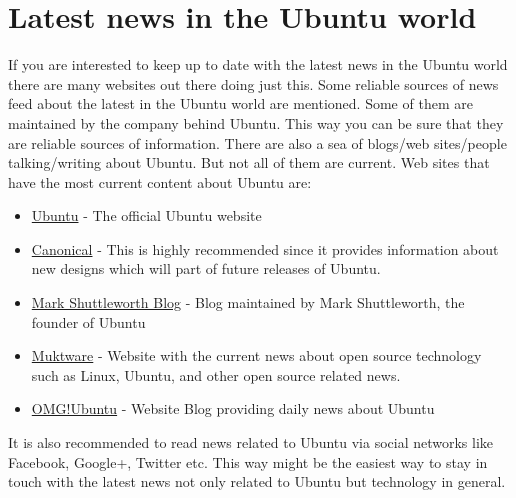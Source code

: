 \section{Latest news in the Ubuntu world} 
If you are interested to keep up to date with the latest news in the Ubuntu world there are many websites out there doing just this. Some reliable sources of news feed about the latest in the Ubuntu world are mentioned. Some of them are maintained by the company behind Ubuntu. This way you can be sure that they are reliable sources of information. There are also a sea of blogs/web sites/people talking/writing about Ubuntu. But not all of them are current.  Web sites that have the most current content about Ubuntu are: 

\begin{itemize}
\item \href{http://www.ubuntu.com}{Ubuntu} - The official Ubuntu website
\item \href{http://design.canonical.com/}{Canonical} - This is highly recommended since it provides information about new designs which will part of future releases of Ubuntu.
\item \href{http://markshuttleworth.com/}{Mark Shuttleworth Blog} - Blog maintained by Mark Shuttleworth, the founder of Ubuntu
\item \href{http://www.muktware.com/}{Muktware} - Website with the current news about open source technology such as Linux, Ubuntu, and other open source related news.
\item \href{http://www.omgubuntu.co.uk/}{OMG!Ubuntu} - Website Blog providing daily news about Ubuntu
\end{itemize}

\par \noindent It is also recommended to read news related to Ubuntu via social networks like Facebook, Google+, Twitter etc. This way might be the easiest way to stay in touch with the latest news not only related to Ubuntu but technology in general.
